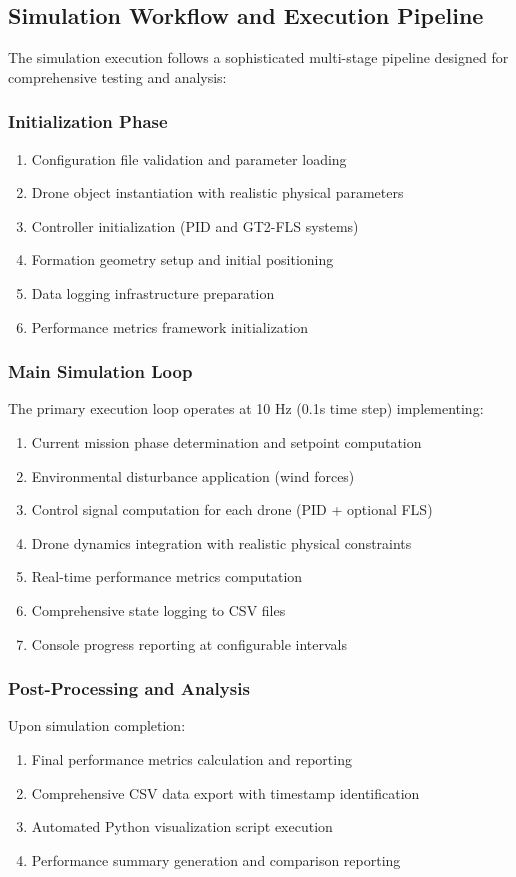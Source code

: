 \subsection*{Simulation Workflow and Execution Pipeline}

The simulation execution follows a sophisticated multi-stage pipeline designed for comprehensive testing and analysis:

\subsubsection*{Initialization Phase}
\begin{enumerate}
    \item Configuration file validation and parameter loading
    \item Drone object instantiation with realistic physical parameters
    \item Controller initialization (PID and GT2-FLS systems)
    \item Formation geometry setup and initial positioning
    \item Data logging infrastructure preparation
    \item Performance metrics framework initialization
\end{enumerate}

\subsubsection*{Main Simulation Loop}
The primary execution loop operates at 10 Hz (0.1s time step) implementing:
\begin{enumerate}
    \item Current mission phase determination and setpoint computation
    \item Environmental disturbance application (wind forces)
    \item Control signal computation for each drone (PID + optional FLS)
    \item Drone dynamics integration with realistic physical constraints
    \item Real-time performance metrics computation
    \item Comprehensive state logging to CSV files
    \item Console progress reporting at configurable intervals
\end{enumerate}

\subsubsection*{Post-Processing and Analysis}
Upon simulation completion:
\begin{enumerate}
    \item Final performance metrics calculation and reporting
    \item Comprehensive CSV data export with timestamp identification
    \item Automated Python visualization script execution
    \item Performance summary generation and comparison reporting
\end{enumerate}

